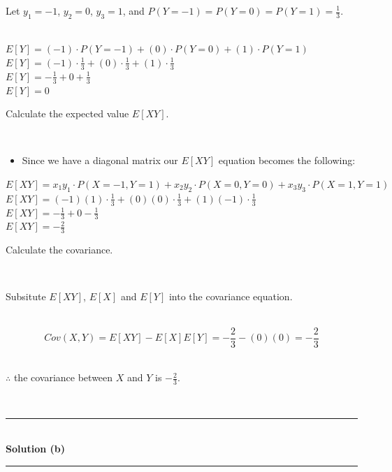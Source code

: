 \documentclass{article}
\begin{document}
\parbox{\textwidth}{Let $y_1 = -1$, $y_2 = 0$, $y_3 = 1$, and $P(Y=-1) = P(Y=0) = P(Y=1) = \frac{1}{3}$.}\\

$E[Y] = (-1) \cdot P(Y = -1) + (0) \cdot P(Y = 0) + (1) \cdot P(Y = 1)$\\

$E[Y] = (-1) \cdot \frac{1}{3} + (0) \cdot \frac{1}{3} + (1) \cdot \frac{1}{3}$\\

$E[Y] = -\frac{1}{3} + 0 + \frac{1}{3}$\\

$E[Y] = 0$\\

\parbox{\textwidth}{Calculate the expected value $E[XY]$.}\\

\begin{itemize}
    \item \parbox{\textwidth}{Since we have a diagonal matrix our $E[XY]$ equation becomes the following:}
\end{itemize}

$E[XY] = x_1 y_1\cdot P(X=-1,Y=1) + x_2 y_2\cdot P(X=0,Y=0)+ x_3 y_3\cdot P(X=1,Y=1)$\\

$E[XY] = (-1)(1) \cdot \frac{1}{3} + (0)(0) \cdot \frac{1}{3}+ (1)(-1)\cdot \frac{1}{3}$\\

$E[XY] = -\frac{1}{3} + 0 - \frac{1}{3}$\\

$E[XY] = -\frac{2}{3}$\\

\parbox{\textwidth}{Calculate the covariance.}\\

\parbox{\textwidth}{Subsitute $E[XY]$, $E[X]$ and $E[Y]$ into the covariance equation.}\\

$$Cov(X, Y) = E[XY] - E[X]E[Y] = -\frac{2}{3} - (0)(0) = -\frac{2}{3}$$\\

\parbox{\textwidth}{$\therefore$ the covariance between $X$ and $Y$ is $-\frac{2}{3}$.}\\

\noindent\rule{\textwidth}{0.4pt}\\

\textbf{Solution (b)}

\noindent\rule{\textwidth}{0.4pt}\\
\end{document}

